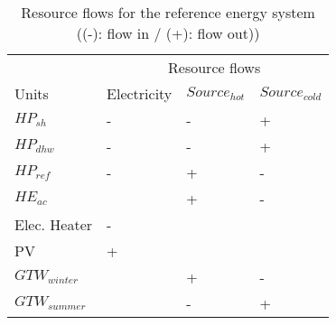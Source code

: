 \begin{table}[h!]
	\centering
	\caption{Resource flows for the reference energy system ((-): flow in / (+): flow out))}\vspace{2mm}
	\label{tab:layers_ref} 
	\begin{tabular}{llll}
		& \multicolumn{3}{c}{Resource flows}             \\
		Units          & Electricity & $Source_{hot}$ & $Source_{cold}$ \\
		$HP_{sh}$      & -           & -              & +               \\
		$HP_{dhw}$     & -           & -              & +               \\
		$HP_{ref}$     & -           & +              & -               \\
		$HE_{ac}$      &             & +              & -               \\
		Elec. Heater   & -           &                &                 \\
		PV             & +           &                &                 \\
		$GTW_{winter}$ &             & +              & -               \\
		$GTW_{summer}$ &             & -              & +              
	\end{tabular}
\end{table}
